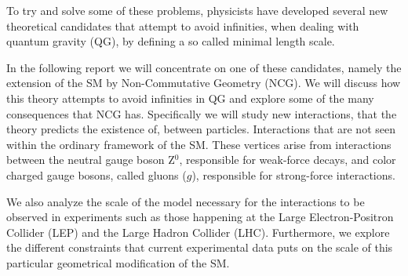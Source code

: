 To try and solve some of these problems, physicists have developed several new theoretical candidates that attempt to avoid infinities, when dealing with quantum gravity (QG), by defining a so called minimal length scale.

In the following report we will concentrate on one of these candidates, namely the extension of the SM by Non-Commutative Geometry (NCG). We will discuss how this theory attempts to avoid infinities in QG and explore some of the many consequences that NCG has. Specifically we will study new interactions, that the theory predicts the existence of, between particles. Interactions that are not seen within the ordinary framework of the SM. These vertices arise from interactions between the neutral gauge boson Z$^0$, responsible for weak-force decays, and color charged gauge bosons, called gluons ($g$), responsible for strong-force interactions.

We also analyze the scale of the model necessary for the interactions to be observed in experiments such as those happening at the Large Electron-Positron Collider (LEP) and the Large Hadron Collider (LHC). Furthermore, we explore the different constraints that current experimental data puts on the scale of this particular geometrical modification of the SM.
